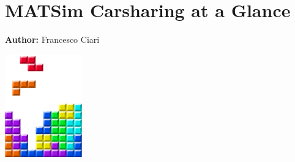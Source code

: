 \chapter{MATSim Carsharing at a Glance }
\label{ch:carsharing}

\hfill \textbf{Author:} Francesco Ciari

\begin{center} \includegraphics[width=0.25\textwidth, angle=0]{figures/MATSimBook.png} \end{center}


\citet[][]{CiariEtAl_TechRep_IVT_2013, CiariEtAl_TechRep_IVT_2014, CiariEtAl_TRB_2009}

